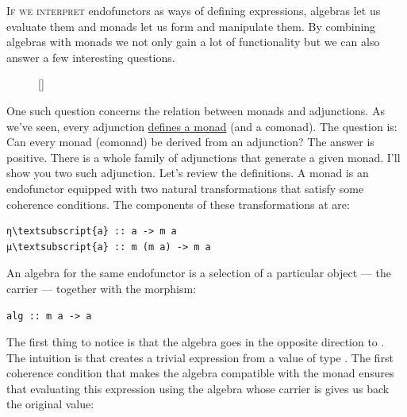 \lettrine[lhang=0.17]{I}{f we interpret} endofunctors as ways of defining expressions, algebras
let us evaluate them and monads let us form and manipulate them. By
combining algebras with monads we not only gain a lot of functionality
but we can also answer a few interesting questions.
\begin{figure}
\raisebox{0pt}[\dimexpr{}\baselineskip\relax]{
}%
\end{figure}

One such question
concerns the relation between monads and adjunctions. As we've seen,
every adjunction \hyperref[monads-categorically]{defines
a monad} (and a comonad). The question is: Can every monad (comonad) be
derived from an adjunction? The answer is positive. There is a whole
family of adjunctions that generate a given monad. I'll show you two
such adjunction.
Let's review the definitions. A monad is an endofunctor 
equipped with two natural transformations that satisfy some coherence
conditions. The components of these transformations at  are:

\begin{Verbatim}[commandchars=\\\{\}]
η\textsubscript{a} :: a -> m a
μ\textsubscript{a} :: m (m a) -> m a
\end{Verbatim}
An algebra for the same endofunctor is a selection of a particular
object --- the carrier  --- together with the morphism:

\begin{Verbatim}[commandchars=\\\{\}]
alg :: m a -> a
\end{Verbatim}
The first thing to notice is that the algebra goes in the opposite
direction to . The intuition is that  creates a
trivial expression from a value of type . The first coherence
condition that makes the algebra compatible with the monad ensures that
evaluating this expression using the algebra whose carrier is 
gives us back the original value:

